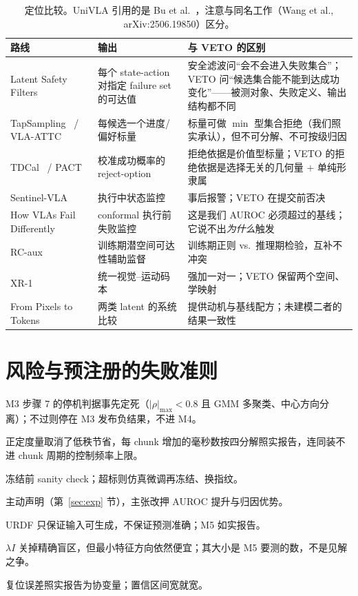\documentclass[11pt,a4paper]{ctexart}
\begin{document}
\begin{table}[h]
\centering\small
\begin{tabular}{@{}lp{4.6cm}p{6.6cm}@{}}
\toprule
路线 & 输出 & 与 VETO 的区别 \\
\midrule
Latent Safety Filters~\cite{lsf} & 每个 state-action 对指定 failure set 的可达值 & 安全滤波问``会不会进入失败集合''；VETO 问``候选集合能不能到达成功变化''——被测对象、失败定义、输出结构都不同 \\
TapSampling~\cite{tapsampling} / VLA-ATTC~\cite{vlaattc} & 每候选一个进度/偏好标量 & 标量可做 $\min$ 型集合拒绝（我们照实承认），但不可分解、不可按级归因 \\
TDCal~\cite{tdcal} / PACT~\cite{pact} & 校准成功概率的 reject-option & 拒绝依据是价值型标量；VETO 的拒绝依据是选择无关的几何量 $+$ 单纯形隶属 \\
Sentinel-VLA~\cite{sentinel} & 执行中状态监控 & 事后报警；VETO 在提交前否决 \\
How VLAs Fail Differently~\cite{howvlasfail} & conformal 执行前失败监控 & 这是我们 AUROC 必须超过的基线；它说不出\emph{为什么}触发 \\
RC-aux~\cite{rcaux} & 训练期潜空间可达性辅助监督 & 训练期正则 vs.\ 推理期检验，互补不冲突 \\
XR-1~\cite{xr1} & 统一视觉--运动码本 & 强加一对一；VETO 保留两个空间、学映射 \\
From Pixels to Tokens~\cite{pixels2tokens} & 两类 latent 的系统比较 & 提供动机与基线配方；未建模二者的结果一致性 \\
\bottomrule
\end{tabular}
\caption{定位比较。UniVLA 引用的是 Bu et al.~\cite{univla}，注意与同名工作（Wang et al., arXiv:2506.19850）区分。}
\end{table}

\section{风险与预注册的失败准则}\label{sec:risk}

\begin{description}[itemsep=2pt]
\item[分量共线。] M3 步骤 7 的停机判据事先定死（$|\rho|_{\max}<0.8$ 且 GMM 多聚类、中心方向分离）；不过则停在 M3 发布负结果，不进 M4。
\item[延迟。] 正定度量取消了低秩节省，每 chunk 增加的毫秒数按四分解照实报告，连同装不进 chunk 周期的控制频率上限。
\item[压缩器域差。] 冻结前 sanity check；超标则仿真微调再冻结、换指纹。
\item[固定秩平坦性证据弱。] 主动声明（第~\ref{sec:exp} 节），主张改押 AUROC 提升与归因优势。
\item[跨本体外推。] URDF 只保证输入可生成，不保证预测准确；M5 如实报告。
\item[对抗绕过空间残留。] $\lambda I$ 关掉精确盲区，但最小特征方向依然便宜；其大小是 M5 要测的数，不是见解之争。
\item[真机反事实配对不完美。] 复位误差照实报告为协变量；置信区间宽就宽。
\end{description}
\end{document}
